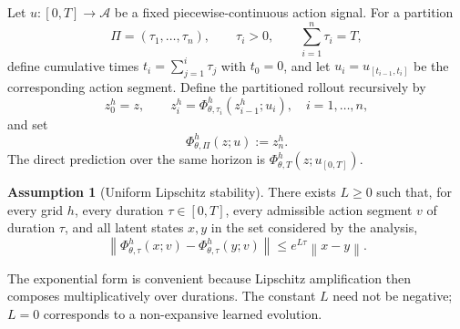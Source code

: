 \documentclass{article}
\theoremstyle{plain}
\theoremstyle{definition}
\newtheorem{assumption}[theorem]{Assumption}
\theoremstyle{remark}
\newcommand{\Aspace}{\mathcal{A}}
\newcommand{\PhiOp}{\Phi}
\newcommand{\norm}[1]{\left\lVert #1 \right\rVert}
\begin{document}
Let $u:[0,T]\rightarrow\Aspace$ be a fixed piecewise-continuous action signal. For a partition
\begin{equation}
\Pi=(\tau_1,\ldots,\tau_n),
\qquad
\tau_i>0,
\qquad
\sum_{i=1}^{n}\tau_i=T,
\end{equation}
define cumulative times $t_i=\sum_{j=1}^{i}\tau_j$ with $t_0=0$, and let $u_i=u_{[t_{i-1},t_i]}$ be the corresponding action segment. Define the partitioned rollout recursively by
\begin{equation}
 z_0^{h}=z,
 \qquad
 z_i^{h}=\PhiOp^{h}_{\theta,\tau_i}(z_{i-1}^{h};u_i),
 \quad i=1,\ldots,n,
\label{eq:partition_rollout_rec}
\end{equation}
and set
\begin{equation}
\PhiOp^{h}_{\theta,\Pi}(z;u):=z_n^{h}.
\label{eq:partition_rollout}
\end{equation}
The direct prediction over the same horizon is $\PhiOp^{h}_{\theta,T}(z;u_{[0,T]})$.

\begin{assumption}[Uniform Lipschitz stability]
\label{ass:lipschitz}
There exists $L\ge0$ such that, for every grid $h$, every duration $\tau\in[0,T]$, every admissible action segment $v$ of duration $\tau$, and all latent states $x,y$ in the set considered by the analysis,
\begin{equation}
\norm{
\PhiOp^{h}_{\theta,\tau}(x;v)
-
\PhiOp^{h}_{\theta,\tau}(y;v)
}
\le
 e^{L\tau}\norm{x-y}.
\label{eq:lipschitz_assumption}
\end{equation}
\end{assumption}
The exponential form is convenient because Lipschitz amplification then composes multiplicatively over durations. The constant $L$ need not be negative; $L=0$ corresponds to a non-expansive learned evolution.
\end{document}
